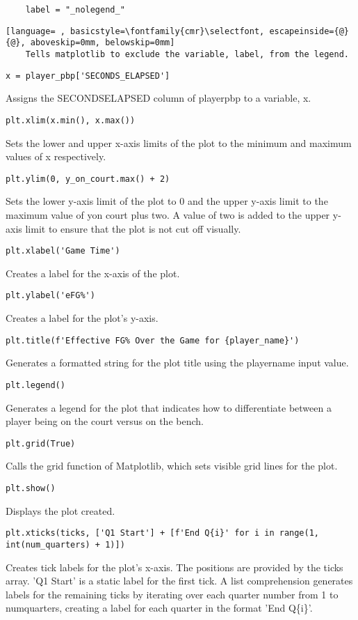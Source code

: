 \documentclass{article}
\begin{document}
\begin{lstlisting}
    label = "_nolegend_"
\end{lstlisting}
\begin{lstlisting}[language= , basicstyle=\fontfamily{cmr}\selectfont, escapeinside={@}{@}, aboveskip=0mm, belowskip=0mm]
    Tells matplotlib to exclude the variable, label, from the legend.
\end{lstlisting}
\begin{lstlisting}
x = player_pbp['SECONDS_ELAPSED']
\end{lstlisting}
Assigns the SECONDS\textunderscore ELAPSED column of player\textunderscore pbp to a variable, x.
\begin{lstlisting}
plt.xlim(x.min(), x.max())
\end{lstlisting}
Sets the lower and upper x-axis limits of the plot to the minimum and maximum values of x respectively.
\begin{lstlisting}
plt.ylim(0, y_on_court.max() + 2)
\end{lstlisting}
Sets the lower y-axis limit of the plot to 0 and the upper y-axis limit to the maximum value of y\textunderscore on \textunderscore court plus two. A value of two is added to the upper y-axis limit to ensure that the plot is not cut off visually.
\begin{lstlisting}
plt.xlabel('Game Time')
\end{lstlisting}
Creates a label for the x-axis of the plot.
\begin{lstlisting}
plt.ylabel('eFG%')
\end{lstlisting}
Creates a label for the plot's y-axis.
\begin{lstlisting}
plt.title(f'Effective FG% Over the Game for {player_name}')
\end{lstlisting}
Generates a formatted string for the plot title using the player\textunderscore name input value.
\begin{lstlisting}
plt.legend()
\end{lstlisting}
Generates a legend for the plot that indicates how to differentiate between a player being on the court versus on the bench.
\begin{lstlisting}
plt.grid(True)
\end{lstlisting}
Calls the grid function of Matplotlib, which sets visible grid lines for the plot.
\begin{lstlisting}
plt.show()
\end{lstlisting}
Displays the plot created.
\begin{lstlisting}
plt.xticks(ticks, ['Q1 Start'] + [f'End Q{i}' for i in range(1, int(num_quarters) + 1)])
\end{lstlisting}
Creates tick labels for the plot's x-axis. The positions are provided by the ticks array. 'Q1 Start' is a static label for the first tick. A list comprehension generates labels for the remaining ticks by iterating over each quarter number from 1 to num\textunderscore quarters, creating a label for each quarter in the format 'End Q\{i\}'.
\begin{lstlisting}
\end{lstlisting}
\end{document}
